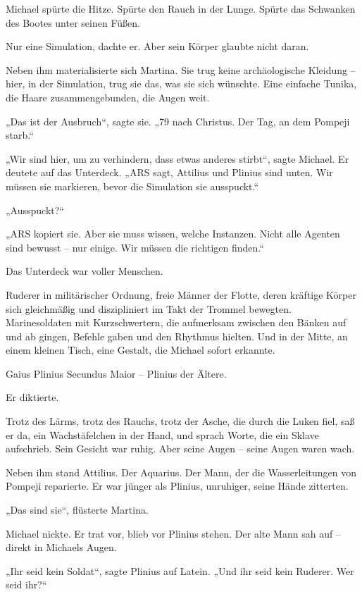 \documentclass[
]{article}
\begin{document}
Michael spürte die Hitze. Spürte den Rauch in der Lunge. Spürte das Schwanken des Bootes unter seinen Füßen.

Nur eine Simulation, dachte er. Aber sein Körper glaubte nicht daran.

Neben ihm materialisierte sich Martina. Sie trug keine archäologische Kleidung -- hier, in der Simulation, trug sie das, was sie sich wünschte. Eine einfache Tunika, die Haare zusammengebunden, die Augen weit.

„Das ist der Ausbruch``, sagte sie. „79 nach Christus. Der Tag, an dem Pompeji starb.``

„Wir sind hier, um zu verhindern, dass etwas anderes stirbt``, sagte Michael. Er deutete auf das Unterdeck. „ARS sagt, Attilius und Plinius sind unten. Wir müssen sie markieren, bevor die Simulation sie ausspuckt.``

„Ausspuckt?{\kern0pt}``

„ARS kopiert sie. Aber sie muss wissen, welche Instanzen. Nicht alle Agenten sind bewusst -- nur einige. Wir müssen die richtigen finden.``

Das Unterdeck war voller Menschen.

Ruderer in militärischer Ordnung, freie Männer der Flotte, deren kräftige Körper sich gleichmäßig und diszipliniert im Takt der Trommel bewegten. Marinesoldaten mit Kurzschwertern, die aufmerksam zwischen den Bänken auf und ab gingen, Befehle gaben und den Rhythmus hielten. Und in der Mitte, an einem kleinen Tisch, eine Gestalt, die Michael sofort erkannte.

Gaius Plinius Secundus Maior -- Plinius der Ältere.

Er diktierte.

Trotz des Lärms, trotz des Rauchs, trotz der Asche, die durch die Luken fiel, saß er da, ein Wachstäfelchen in der Hand, und sprach Worte, die ein Sklave aufschrieb. Sein Gesicht war ruhig. Aber seine Augen -- seine Augen waren wach.

Neben ihm stand Attilius. Der Aquarius. Der Mann, der die Wasserleitungen von Pompeji reparierte. Er war jünger als Plinius, unruhiger, seine Hände zitterten.

„Das sind sie``, flüsterte Martina.

Michael nickte. Er trat vor, blieb vor Plinius stehen. Der alte Mann sah auf -- direkt in Michaels Augen.

„Ihr seid kein Soldat``, sagte Plinius auf Latein. „Und ihr seid kein Ruderer. Wer seid ihr?{\kern0pt}``
\end{document}
